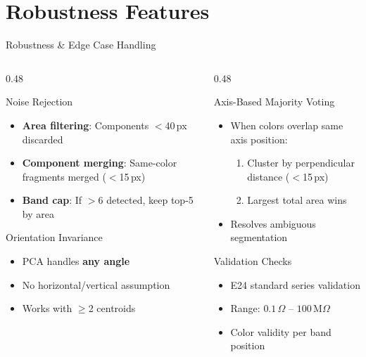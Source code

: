 \documentclass[aspectratio=169, 11pt]{beamer}
\newenvironment{compactitemize}{%
  \begin{itemize}\setlength{\itemsep}{1pt}\setlength{\parskip}{0pt}\setlength{\parsep}{0pt}%
}{\end{itemize}}
\newenvironment{compactenum}{%
  \begin{enumerate}\setlength{\itemsep}{1pt}\setlength{\parskip}{0pt}\setlength{\parsep}{0pt}%
}{\end{enumerate}}
\begin{document}
\section{Robustness Features}

\begin{frame}{Robustness \& Edge Case Handling}
\small
\begin{columns}[T]
\begin{column}{0.48\textwidth}
\begin{block}{Noise Rejection}
\small
\begin{compactitemize}
  \item \textbf{Area filtering}: Components $<$40\,px discarded
  \item \textbf{Component merging}: Same-color fragments merged ($<$15\,px)
  \item \textbf{Band cap}: If $>$6 detected, keep top-5 by area
\end{compactitemize}
\end{block}
\vspace{0.05cm}
\begin{block}{Orientation Invariance}
\small
\begin{compactitemize}
  \item PCA handles \textbf{any angle}
  \item No horizontal/vertical assumption
  \item Works with $\geq$2 centroids
\end{compactitemize}
\end{block}
\end{column}
\begin{column}{0.48\textwidth}
\begin{block}{Axis-Based Majority Voting}
\small
\begin{compactitemize}
  \item When colors overlap same axis position:
  \begin{compactenum}
    \item Cluster by perpendicular distance ($<$15\,px)
    \item Largest total area wins
  \end{compactenum}
  \item Resolves ambiguous segmentation
\end{compactitemize}
\end{block}
\vspace{0.05cm}
\begin{block}{Validation Checks}
\small
\begin{compactitemize}
  \item E24 standard series validation
  \item Range: $0.1\,\Omega$ -- $100\,\text{M}\Omega$
  \item Color validity per band position
\end{compactitemize}
\end{block}
\end{column}
\end{columns}
\end{frame}
\end{document}

